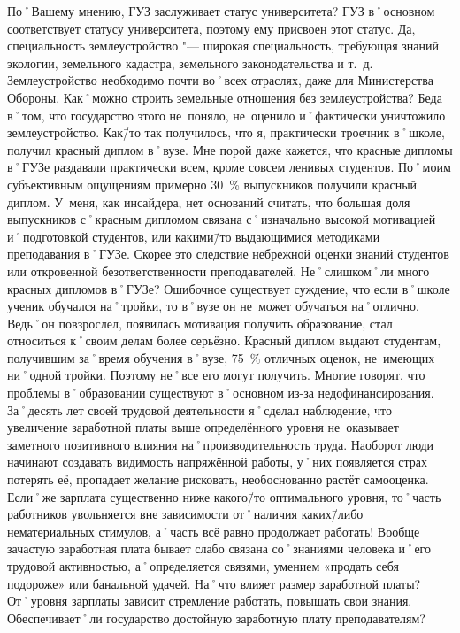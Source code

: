 \begin{drama}
	\maxspeaks По˚Вашему мнению, ГУЗ заслуживает статус университета?
	\michaelspeaks ГУЗ в˚основном соответствует статусу университета, поэтому ему присвоен этот статус. Да, специальность землеустройство "--- широкая специальность, требующая знаний экологии, земельного кадастра, земельного законодательства и т.~д. Землеустройство необходимо почти во˚всех отраслях, даже для Министерства Обороны. Как˚можно строить земельные отношения без землеустройства? Беда в˚том, что государство этого не~поняло, не~оценило и˚фактически уничтожило землеустройство.
	\maxspeaks Как\=/то так получилось, что я, практически троечник в˚школе, получил красный диплом в˚вузе. Мне порой даже кажется, что красные дипломы в˚ГУЗе раздавали практически всем, кроме совсем ленивых студентов. По˚моим субъективным ощущениям примерно 30~\% выпускников получили красный диплом. У~меня, как инсайдера, нет оснований считать, что большая доля выпускников с˚красным дипломом связана с˚изначально высокой мотивацией и˚подготовкой студентов, или какими\=/то выдающимися методиками преподавания в˚ГУЗе. Скорее это следствие небрежной оценки знаний студентов или откровенной безответственности преподавателей. Не˚слишком˚ли много красных дипломов в˚ГУЗе?
	\michaelspeaks Ошибочное существует суждение, что если в˚школе ученик обучался на˚тройки, то в˚вузе он не~может обучаться на˚отлично. Ведь˚он повзрослел, появилась мотивация получить образование, стал относиться к˚своим делам более серьёзно. Красный диплом выдают студентам, получившим за˚время обучения в˚вузе, 75~\% отличных оценок, не~имеющих ни˚одной тройки. Поэтому не˚все его могут получить.
	\maxspeaks Многие говорят, что проблемы в˚образовании существуют в˚основном из-за недофинансирования. За˚десять лет своей трудовой деятельности я˚сделал наблюдение, что увеличение заработной платы выше определённого уровня не~оказывает заметного позитивного влияния на˚производительность труда. Наоборот люди начинают создавать видимость напряжённой работы, у˚них появляется страх потерять её, пропадает желание рисковать, необоснованно растёт самооценка. Если˚же зарплата существенно ниже какого\=/то оптимального уровня, то˚часть работников увольняется вне зависимости от˚наличия каких\=/либо нематериальных стимулов, а˚часть всё равно продолжает работать! Вообще зачастую заработная плата бывает слабо связана со˚знаниями человека и˚его трудовой активностью, а˚определяется связями, умением  «продать себя подороже» или банальной удачей. На˚что влияет размер заработной платы?
	\michaelspeaks От˚уровня зарплаты зависит стремление работать, повышать свои знания.
	\maxspeaks Обеспечивает˚ли государство достойную заработную плату преподавателям? 

\end{drama}
